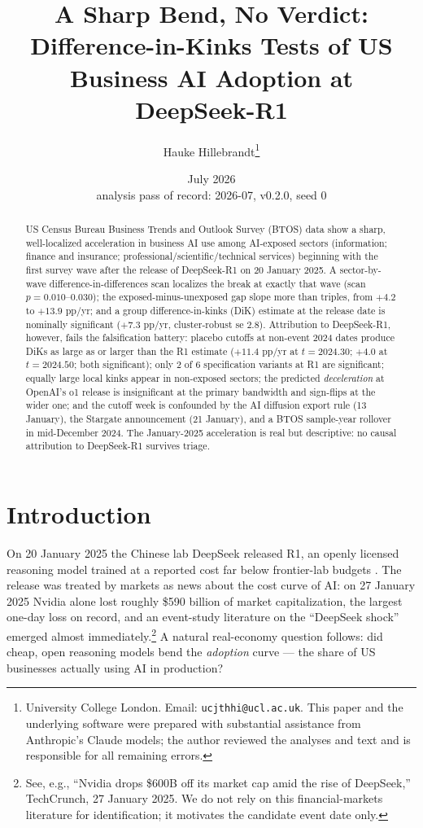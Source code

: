 \documentclass[11pt]{article}
\title{A Sharp Bend, No Verdict: Difference-in-Kinks Tests of US Business AI
Adoption at DeepSeek-R1}
\author{Hauke Hillebrandt\thanks{University College London. Email:
\texttt{ucjthhi@ucl.ac.uk}. This paper and the underlying \natex{} software were
prepared with substantial assistance from Anthropic's Claude models; the author
reviewed the analyses and text and is responsible for all remaining errors.}}
\date{July 2026 \\ \small analysis pass of record: 2026-07, \natex{} v0.2.0, seed 0}
\begin{document}
\maketitle

\begin{abstract}
\noindent US Census Bureau Business Trends and Outlook Survey (BTOS) data show a
sharp, well-localized acceleration in business AI use among AI-exposed sectors
(information; finance and insurance; professional/scientific/technical services)
beginning with the first survey wave after the release of DeepSeek-R1 on 20
January 2025. A sector-by-wave difference-in-differences scan localizes the
break at exactly that wave (scan $p=0.010$--$0.030$); the exposed-minus-unexposed
gap slope more than triples, from $+4.2$ to $+13.9$ pp/yr;
and a group difference-in-kinks (DiK) estimate at the release date is nominally
significant ($+7.3$ pp/yr, cluster-robust se $2.8$). Attribution to DeepSeek-R1,
however, fails the falsification battery: placebo cutoffs at non-event 2024
dates produce DiKs as large as
or larger than the R1 estimate ($+11.4$ pp/yr at $t=2024.30$; $+4.0$ at
$t=2024.50$; both significant); only 2 of 6 specification variants at R1 are
significant; equally large local kinks appear in non-exposed sectors; the
predicted \emph{deceleration} at OpenAI's o1 release is insignificant at the
primary bandwidth and sign-flips at the wider one; and the cutoff week is
confounded by the AI diffusion export rule (13 January), the Stargate
announcement (21 January), and a BTOS sample-year rollover in mid-December
2024. The January-2025 acceleration is real but descriptive: no causal
attribution to DeepSeek-R1 survives triage.
\end{abstract}

\section{Introduction}\label{sec:intro}

On 20 January 2025 the Chinese lab DeepSeek released R1, an openly licensed
reasoning model trained at a reported cost far below frontier-lab budgets
\cite{guo2025}. The release was treated by markets as news about the cost curve
of AI: on 27 January 2025 Nvidia alone lost roughly \$590 billion of market
capitalization, the largest one-day loss on record, and an event-study
literature on the ``DeepSeek shock'' emerged almost immediately.\footnote{See,
e.g., ``Nvidia drops \$600B off its market cap amid the rise of DeepSeek,''
TechCrunch, 27 January 2025. We do not rely on this financial-markets
literature for identification; it motivates the candidate event date only.} A natural real-economy question
follows: did cheap, open reasoning models bend the \emph{adoption} curve --- the
share of US businesses actually using AI in production?
\end{document}

